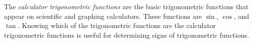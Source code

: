 \documentclass[12pt]{article}
\begin{document}
The \emph{calculator trigonometric functions} are the basic trigonometric functions that appear on scientific and graphing calculators.  These functions are $\sin$, $\cos$, and $\tan$.  Knowing which of the trigonometric functions are the calculator trigonometric functions is useful for determining signs of trigonometric functions.
\end{document}
